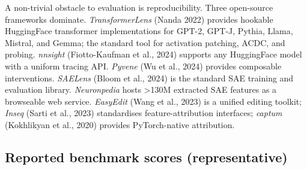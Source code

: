 A non-trivial obstacle to evaluation is reproducibility. Three open-source frameworks dominate. \emph{TransformerLens} (Nanda 2022) provides hookable HuggingFace transformer implementations for GPT-2, GPT-J, Pythia, Llama, Mistral, and Gemma; the standard tool for activation patching, ACDC, and probing. \emph{nnsight} (Fiotto-Kaufman et al., 2024) supports any HuggingFace model with a uniform tracing API. \emph{Pyvene} (Wu et al., 2024) provides composable interventions. \emph{SAELens} (Bloom et al., 2024) is the standard SAE training and evaluation library. \emph{Neuronpedia} hosts \textgreater130M extracted SAE features as a browseable web service. \emph{EasyEdit} (Wang et al., 2023) is a unified editing toolkit; \emph{Inseq} (Sarti et al., 2023) standardises feature-attribution interfaces; \emph{captum} (Kokhlikyan et al., 2020) provides PyTorch-native attribution.

\subsection{Reported benchmark scores (representative)}\label{reported-benchmark-scores-representative}

